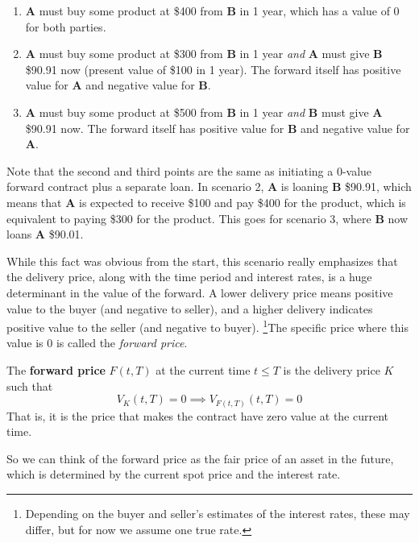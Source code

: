 \documentclass{article}
\begin{document}
    \begin{enumerate}
      \item \textbf{A} must buy some product at \$400 from \textbf{B} in 1 year, which has a value of $0$ for both parties.  
      \item \textbf{A} must buy some product at \$300 from \textbf{B} in 1 year \textit{and} \textbf{A} must give \textbf{B} \$90.91 now (present value of \$100 in 1 year). The forward itself has positive value for \textbf{A} and negative value for \textbf{B}. 
      \item \textbf{A} must buy some product at \$500 from \textbf{B} in 1 year \textit{and} \textbf{B} must give \textbf{A} \$90.91 now. The forward itself has positive value for \textbf{B} and negative value for \textbf{A}. 
    \end{enumerate}
    Note that the second and third points are the same as initiating a $0$-value forward contract plus a separate loan. In scenario 2, \textbf{A} is loaning \textbf{B} \$90.91, which means that \textbf{A} is expected to receive \$100 and pay \$400 for the product, which is equivalent to paying \$300 for the product. This goes for scenario 3, where \textbf{B} now loans \textbf{A} \$90.01. 

    While this fact was obvious from the start, this scenario really emphasizes that the delivery price, along with the time period and interest rates, is a huge determinant in the value of the forward. A lower delivery price means positive value to the buyer (and negative to seller), and a higher delivery indicates positive value to the seller (and negative to buyer). \footnote{Depending on the buyer and seller's estimates of the interest rates, these may differ, but for now we assume one true rate. }The specific price where this value is $0$ is called the \textit{forward price}.

    \begin{definition}
      \label{def:forward-price}
      The \textbf{forward price} $F(t, T)$ at the current time $t \leq T$ is the delivery price $K$ such that 
      \begin{equation}
        V_K (t, T) = 0 \implies V_{F(t, T)} (t, T) = 0 
      \end{equation}
      That is, it is the price that makes the contract have zero value at the current time. 
    \end{definition}

    So we can think of the forward price as the fair price of an asset in the future, which is determined by the current spot price and the interest rate. 
\end{document}
